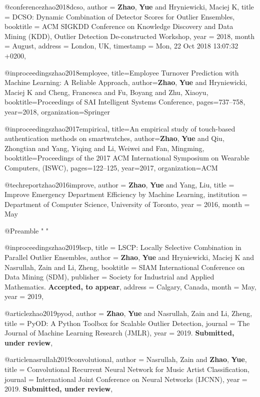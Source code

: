 @conference{zhao2018dcso,
    author    = {\textbf{Zhao}, \textbf{Yue} and Hryniewicki, Maciej K},
    title     = {{DCSO:}  Dynamic Combination of Detector Scores for 
               Outlier Ensembles},
    booktitle = {ACM SIGKDD Conference on Knowledge Discovery and Data Mining {(KDD)}, Outlier Detection De-constructed Workshop},
    year = {2018},
    month = {August},
    address = {London, UK},
    timestamp = {Mon, 22 Oct 2018 13:07:32 +0200},
}

@inproceedings{zhao2018employee,
  title={Employee Turnover Prediction with Machine Learning: A Reliable Approach},
  author={\textbf{Zhao}, \textbf{Yue} and Hryniewicki, Maciej K and Cheng, Francesca and Fu, Boyang and Zhu, Xiaoyu},
  booktitle={Proceedings of SAI Intelligent Systems Conference},
  pages={737--758},
  year={2018},
  organization={Springer}
}

@inproceedings{zhao2017empirical,
  title={An empirical study of touch-based authentication methods on smartwatches},
  author={\textbf{Zhao}, \textbf{Yue} and Qiu, Zhongtian and Yang, Yiqing and Li, Weiwei and Fan, Mingming},
  booktitle={Proceedings of the 2017 ACM International Symposium on Wearable Computers, {(ISWC)}},
  pages={122--125},
  year={2017},
  organization={ACM}
}

@techreport{zhao2016improve,
  author =  {\textbf{Zhao}, \textbf{Yue} and Yang, Liu},
  title =   {Improve Emergency Department Efficiency by Machine Learning},
  institution =  {Department of Computer Science, University of Toronto},
  year  = {2016},
  month = {May}
}

@Preamble{ " \newcommand{\noop}[1]{} " }

@inproceedings{zhao2019lscp,
  title = {{LSCP}: Locally Selective Combination in Parallel Outlier Ensembles},
  author = {\textbf{Zhao}, \textbf{Yue} and Hryniewicki, Maciej K and Nasrullah, Zain and Li, Zheng},
  booktitle = {SIAM International Conference on Data Mining ({SDM})},
  publisher = {Society for Industrial and Applied Mathematics. \textbf{Accepted, to appear}},
  address = {Calgary, Canada},
  month = {May},
  year = {2019},
 }
 
@article{zhao2019pyod,
    author = {\textbf{Zhao}, \textbf{Yue} and Nasrullah, Zain and Li, Zheng},
    title = {{PyOD:} A Python Toolbox for Scalable Outlier Detection},
    journal = {The Journal of Machine Learning Research (JMLR)},
    year      = {2019. \textbf{Submitted, under review}},
}

@article{nasrullah2019convolutional,
    author = {Nasrullah, Zain and \textbf{Zhao}, \textbf{Yue}},
    title = {Convolutional Recurrent Neural Network for Music Artist Classification},
    journal = {International Joint Conference on Neural Networks ({IJCNN})},
    year      = {2019. \textbf{Submitted, under review}},
}

